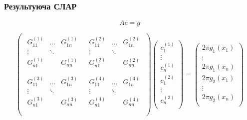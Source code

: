 \documentclass{beamer}
\numberwithin{equation}{section}
\begin{document}
	\begin{frame}
		\frametitle{Результуюча СЛАР}
		
		\begin{block}{}
			\Large
			$$
			Ac=g
			$$	
		\end{block}
		
		\begin{block}{}
		$$
		\begin{pmatrix}
			\begin{matrix}
				G^{(1)}_{11} & \dots  & G^{(1)}_{1n} \\
				\vdots 		 & \ddots & \\
				G^{(1)}_{n1} & 		  & G^{(1)}_{nn} \\
			\end{matrix} &
			\begin{matrix}
				G^{(2)}_{11} & \dots  & G^{(2)}_{1n} \\
				\vdots 		 & \ddots & \\
				G^{(2)}_{n1} & 		  & G^{(2)}_{nn} \\
			\end{matrix} \\[1cm]
			\begin{matrix}
				G^{(3)}_{11} & \dots  & G^{(3)}_{1n} \\
				\vdots 		 & \ddots & \\
				G^{(3)}_{n1} & 		  & G^{(3)}_{nn} \\
			\end{matrix} &
			\begin{matrix}
				G^{(4)}_{11} & \dots  & G^{(4)}_{1n} \\
				\vdots 		 & \ddots & \\
				G^{(4)}_{n1} & 		  & G^{(4)}_{nn} \\
			\end{matrix} \\
		\end{pmatrix}
		\begin{pmatrix}
			c^{(1)}_1\\
			\vdots\\
			c^{(1)}_n\\[0.5cm]
			c^{(2)}_1\\
			\vdots\\
			c^{(2)}_n\\
		\end{pmatrix}
		= 
		\begin{pmatrix}
			2\pi g_1(x_1)\\
			\vdots\\
			2\pi g_1(x_n)\\[0.5cm]
			2\pi g_2(x_1)\\
			\vdots\\
			2\pi g_2(x_n)\\
		\end{pmatrix}
		$$
		\end{block}
		
	\end{frame}
		
\end{document}
